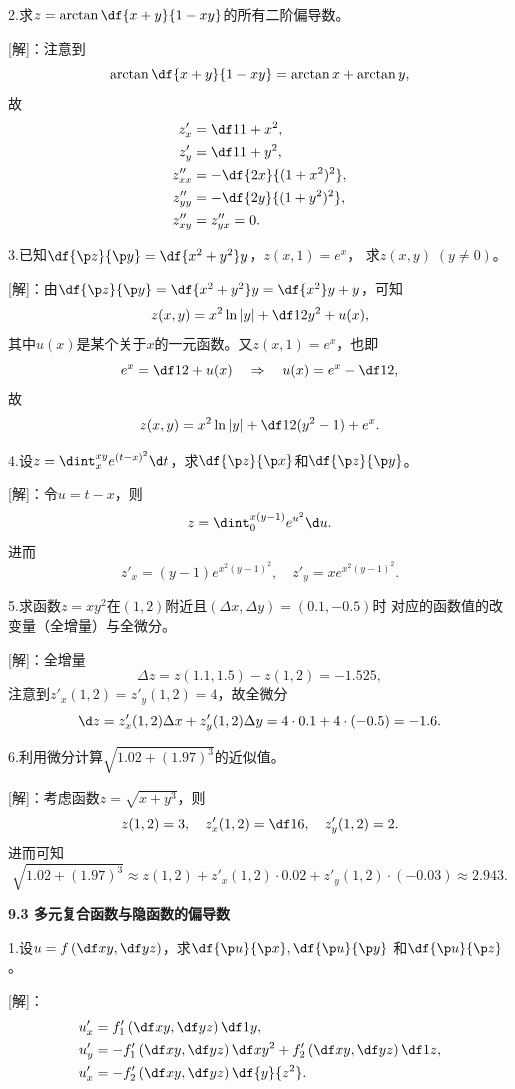2.求$z=\arctan\df{x+y}{1-xy}$的所有二阶偏导数。

[解]：注意到
$$\arctan\df{x+y}{1-xy}=\arctan x+\arctan y,$$
故
\begin{align*}
	z'_x&=\df1{1+x^2},\\
	z'_y&=\df1{1+y^2},\\
	z''_{xx}&=-\df{2x}{(1+x^2)^2},\\
	z''_{yy}&=-\df{2y}{(1+y^2)^2},\\
	z''_{xy}&=z''_{yx}=0.
\end{align*}
\fin

\bs

3.已知$\df{\p z}{\p y}=\df{x^2+y^2}y$，$z(x,1)=e^x$，
求$z(x,y)\;(y\ne0)$。

[解]：由$\df{\p z}{\p y}=\df{x^2+y^2}y=\df{x^2}y+y$，可知
$$z(x,y)=x^2\ln|y|+\df12y^2+u(x),$$
其中$u(x)$是某个关于$x$的一元函数。又$z(x,1)=e^x$，也即
$$e^x=\df12+u(x)\quad
\Rightarrow\quad u(x)=e^x-\df12,$$
故
$$z(x,y)=x^2\ln|y|+\df12(y^2-1)+e^x.$$
\fin

\bs

4.设$z=\dint_x^{xy}e^{(t-x)^2}\d t$，求$\df{\p z}{\p x}$和$\df{\p z}{\p y}$。

[解]：令$u=t-x$，则
$$z=\dint_0^{x(y-1)}e^{u^2}\d u.$$
进而
$$
	z'_x=(y-1)e^{x^2(y-1)^2},\quad z'_y=xe^{x^2(y-1)^2}.
$$
\fin

\bs

5.求函数$z=xy^2$在$(1,2)$附近且$(\Delta x,\Delta y)=(0.1,-0.5)$时
对应的函数值的改变量（全增量）与全微分。

[解]：全增量
$$\Delta z=z(1.1,1.5)-z(1,2)=-1.525,$$
注意到$z'_x(1,2)=z'_y(1,2)=4$，故全微分
$$\d z=z'_x(1,2)\Delta x+z'_y(1,2)\Delta y
=4\cdot 0.1+4\cdot(-0.5)=-1.6.$$
\fin

\bs

6.利用微分计算$\sqrt{1.02+(1.97)^3}$的近似值。

[解]：考虑函数$z=\sqrt{x+y^3}$，则
$$z(1,2)=3,\quad z'_x(1,2)=\df16,\quad z'_y(1,2)=2.$$
进而可知
$$\sqrt{1.02+(1.97)^3}
\approx z(1,2)+z'_x(1,2)\cdot0.02+z'_y(1,2)\cdot(-0.03)
\approx 2.943.$$
\fin

\bs

\begin{center}
	\bf 9.3 多元复合函数与隐函数的偏导数
\end{center}

1.设$u=f\left(\df xy,\df yz\right)$，求$\df {\p u}{\p x},\df {\p u}{\p y}$
和$\df {\p u}{\p z}$。

[解]：
\begin{align*}
	u'_x&=f'_1\left(\df xy,\df yz\right)\df1y,\\
	u'_y&=-f'_1\left(\df xy,\df yz\right)\df x{y^2}
	+f'_2\left(\df xy,\df yz\right)\df1z,\\
	u'_x&=-f'_2\left(\df xy,\df yz\right)\df{y}{z^2}.
\end{align*}
\fin

